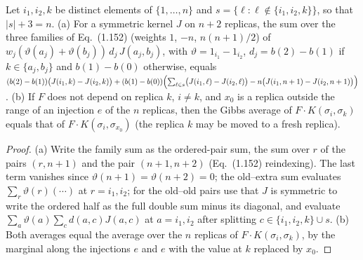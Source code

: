 \begin{lemma}
\label{lem:sg-tal:regroup-189}
  \leanok
{}
Let $i_1,i_2,k$ be distinct elements of $\{1,\dots,n\}$ and $s=\{\ell:\ell\notin\{i_1,i_2,k\}\}$, so that
$|s|+3=n$.  (a) For a symmetric kernel $J$ on $n+2$ replicas, the sum over the three families of
Eq.~(1.152) (weights $1$, $-n$, $n(n+1)/2$) of $w_j(\vartheta(a_j)+\vartheta(b_j))\,d_j\,J(a_j,b_j)$,
with $\vartheta=1_{i_1}-1_{i_2}$, $d_j=b(2)-b(1)$ if $k\in\{a_j,b_j\}$ and $b(1)-b(0)$ otherwise, equals
$(b(2)-b(1))\bigl(J(i_1,k)-J(i_2,k)\bigr)+(b(1)-b(0))\Bigl(\sum_{\ell\in s}\bigl(J(i_1,\ell)-J(i_2,\ell)\bigr)
-n\bigl(J(i_1,n+1)-J(i_2,n+1)\bigr)\Bigr)$.
(b) If $F$ does not depend on replica $k$, $i\ne k$, and $x_0$ is a replica outside the range of
an injection $e$ of the $n$ replicas, then the Gibbs average of $F\cdot K(\sigma_i,\sigma_k)$ equals that of
$F\cdot K(\sigma_i,\sigma_{x_0})$ (the replica $k$ may be moved to a fresh replica).
\end{lemma}
\begin{proof}
  \leanok
(a) Write the family sum as the ordered-pair sum, the sum over $r$ of the pairs $(r,n+1)$ and the
pair $(n+1,n+2)$ (Eq.~(1.152) reindexing).  The last term vanishes since $\vartheta(n+1)=\vartheta(n+2)=0$;
the old--extra sum evaluates $\sum_r\vartheta(r)(\cdots)$ at $r=i_1,i_2$; for the old--old pairs
use that $J$ is symmetric to write the ordered half as the full double sum minus its diagonal, and
evaluate $\sum_a\vartheta(a)\sum_c d(a,c)J(a,c)$ at $a=i_1,i_2$ after splitting $c\in\{i_1,i_2,k\}\cup s$.
(b) Both averages equal the average over the $n$ replicas of $F\cdot K(\sigma_i,\sigma_k)$, by the marginal
along the injections $e$ and $e$ with the value at $k$ replaced by $x_0$.
\end{proof}

